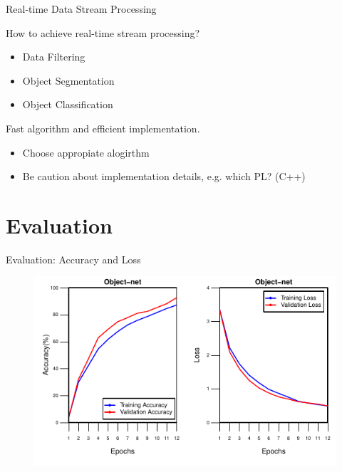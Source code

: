 \documentclass[9pt]{beamer}
\begin{document}

\begin{frame}[fragile]{Real-time Data Stream Processing}
	
	How to achieve real-time stream processing? 

	
\begin{itemize}
	\item {} Data Filtering
	\item {} Object Segmentation
	\item {} Object Classification
\end{itemize}

Fast algorithm and efficient implementation. 

\begin{itemize}
	\item Choose appropiate alogirthm
	\item Be caution about implementation details, e.g. which PL? (C++)
\end{itemize}

\end{frame}



\section{Evaluation}


\begin{frame}[fragile]{Evaluation: Accuracy and Loss }
	\begin{figure}
		\centering
		\includegraphics[width=\textwidth]{images/one_to_one.pdf}

	\end{figure}
\end{frame}
\end{document}
